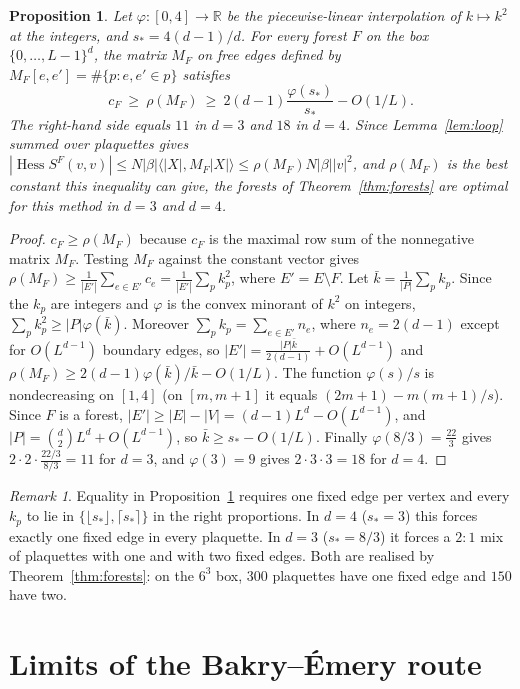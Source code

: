 \documentclass[11pt]{amsart}
\newtheorem{proposition}[theorem]{Proposition}
\theoremstyle{definition}
\theoremstyle{remark}
\newtheorem{remark}[theorem]{Remark}
\newcommand{\Hess}{\operatorname{Hess}}
\begin{document}
\begin{proposition}\label{prop:lower}
Let $\varphi:[0,4]\to\mathbb{R}$ be the piecewise-linear interpolation of $k\mapsto k^2$ at the integers, and
$s_*=4(d-1)/d$. For every forest $F$ on the box $\{0,\dots,L-1\}^d$, the matrix $M_F$ on free edges defined by
$M_F[e,e']=\#\{p:e,e'\in p\}$ satisfies
\[
c_F\ \ge\ \rho(M_F)\ \ge\ 2(d-1)\frac{\varphi(s_*)}{s_*}-O(1/L).
\]
The right-hand side equals $11$ in $d=3$ and $18$ in $d=4$. Since Lemma~\ref{lem:loop} summed over plaquettes gives
$|\Hess S^F(v,v)|\le N|\beta|\langle|X|,M_F|X|\rangle\le\rho(M_F)N|\beta||v|^2$, and $\rho(M_F)$ is the best constant
this inequality can give, the forests of Theorem~\ref{thm:forests} are optimal for this method in $d=3$ and $d=4$.
\end{proposition}

\begin{proof}
$c_F\ge\rho(M_F)$ because $c_F$ is the maximal row sum of the nonnegative matrix $M_F$. Testing $M_F$ against the
constant vector gives $\rho(M_F)\ge\frac{1}{|E'|}\sum_{e\in E'}c_e=\frac{1}{|E'|}\sum_pk_p^2$, where $E'=E\setminus F$.
Let $\bar k=\frac{1}{|P|}\sum_pk_p$. Since the $k_p$ are integers and $\varphi$ is the convex minorant of $k^2$ on
integers, $\sum_pk_p^2\ge|P|\varphi(\bar k)$. Moreover $\sum_pk_p=\sum_{e\in E'}n_e$, where $n_e=2(d-1)$ except for
$O(L^{d-1})$ boundary edges, so $|E'|=\frac{|P|\bar k}{2(d-1)}+O(L^{d-1})$ and
$\rho(M_F)\ge2(d-1)\varphi(\bar k)/\bar k-O(1/L)$. The function $\varphi(s)/s$ is nondecreasing on $[1,4]$ (on
$[m,m+1]$ it equals $(2m+1)-m(m+1)/s$). Since $F$ is a forest, $|E'|\ge|E|-|V|=(d-1)L^d-O(L^{d-1})$, and
$|P|=\binom{d}{2}L^d+O(L^{d-1})$, so $\bar k\ge s_*-O(1/L)$. Finally
$\varphi(8/3)=\frac{22}{3}$ gives $2\cdot2\cdot\frac{22/3}{8/3}=11$ for $d=3$, and $\varphi(3)=9$ gives
$2\cdot3\cdot3=18$ for $d=4$.
\end{proof}

\begin{remark}
Equality in Proposition~\ref{prop:lower} requires one fixed edge per vertex and every $k_p$ to lie in
$\{\lfloor s_*\rfloor,\lceil s_*\rceil\}$ in the right proportions. In $d=4$ ($s_*=3$) this forces exactly one fixed
edge in every plaquette. In $d=3$ ($s_*=8/3$) it forces a $2:1$ mix of plaquettes with one and with two fixed edges.
Both are realised by Theorem~\ref{thm:forests}: on the $6^3$ box, $300$ plaquettes have one fixed edge and $150$ have
two.
\end{remark}

\section{Limits of the Bakry--\'Emery route}\label{sec:limits}
\end{document}
